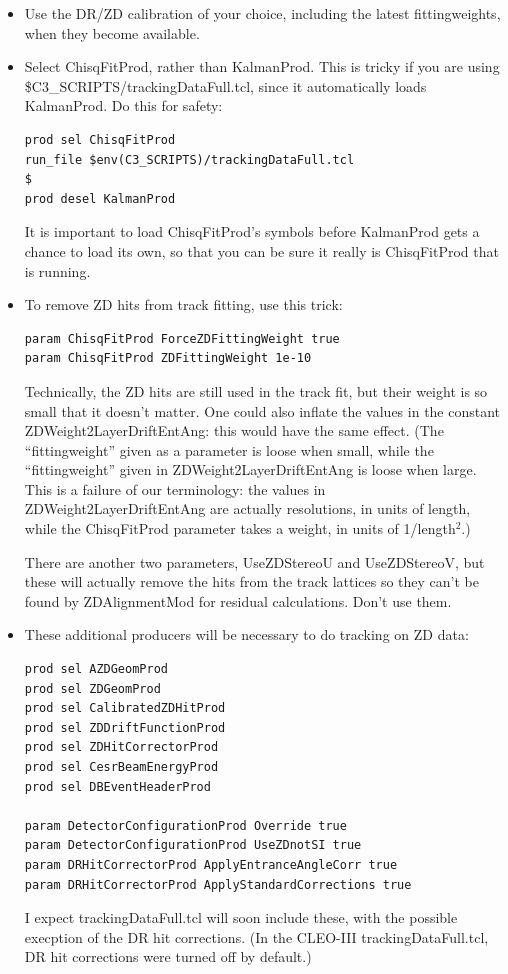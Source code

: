 \documentclass[12pt]{article}
\begin{document}
\begin{itemize}
  \item Use the DR/ZD calibration of your choice, including the latest
  fittingweights, when they become available.

  \item Select ChisqFitProd, rather than KalmanProd.  This is tricky
  if you are using \$C3\_SCRIPTS/trackingDataFull.tcl, since it
  automatically loads KalmanProd.  Do this for safety:
  \begin{verbatim}
prod sel ChisqFitProd
run_file $env(C3_SCRIPTS)/trackingDataFull.tcl                                         $
prod desel KalmanProd \end{verbatim}
  It is important to load ChisqFitProd's symbols before KalmanProd
  gets a chance to load its own, so that you can be sure it really is
  ChisqFitProd that is running.

  \item To remove ZD hits from track fitting, use this trick:
  \begin{verbatim}
param ChisqFitProd ForceZDFittingWeight true
param ChisqFitProd ZDFittingWeight 1e-10 \end{verbatim} \label{fittingweights}
  Technically, the ZD hits are still used in the track fit, but their
  weight is so small that it doesn't matter.  One could also inflate
  the values in the constant ZDWeight2LayerDriftEntAng: this would
  have the same effect.  (The ``fittingweight'' given as a parameter
  is loose when small, while the ``fittingweight'' given in
  ZDWeight2LayerDriftEntAng is loose when large.  This is a failure of
  our terminology: the values in ZDWeight2LayerDriftEntAng are
  actually resolutions, in units of length, while the ChisqFitProd
  parameter takes a weight, in units of 1/length$^2$.)

  There are another two parameters, UseZDStereoU and UseZDStereoV, but
  these will actually remove the hits from the track lattices so they
  can't be found by ZDAlignmentMod for residual calculations.  Don't
  use them.

  \item These additional producers will be necessary to do tracking on
  ZD data:
\begin{verbatim}
prod sel AZDGeomProd
prod sel ZDGeomProd
prod sel CalibratedZDHitProd
prod sel ZDDriftFunctionProd
prod sel ZDHitCorrectorProd
prod sel CesrBeamEnergyProd
prod sel DBEventHeaderProd

param DetectorConfigurationProd Override true
param DetectorConfigurationProd UseZDnotSI true
param DRHitCorrectorProd ApplyEntranceAngleCorr true
param DRHitCorrectorProd ApplyStandardCorrections true \end{verbatim}
  I expect trackingDataFull.tcl will soon include these, with the
  possible execption of the DR hit corrections.  (In the CLEO-III
  trackingDataFull.tcl, DR hit corrections were turned off by
  default.)


\end{itemize}
\end{document}
